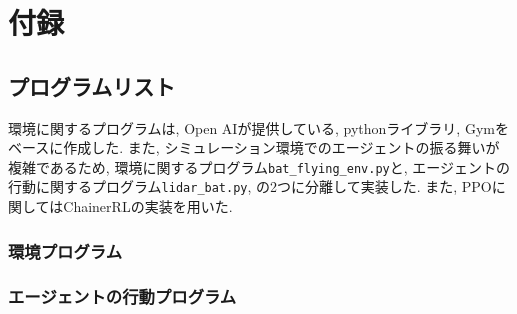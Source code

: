 \documentclass[../main]{subfiles}
\begin{document}
\lstset{language=Python, basicstyle=\ttfamily}

\newpage

\chapter*{付録}


\section{プログラムリスト}
環境に関するプログラムは, Open AIが提供している, 
pythonライブラリ, Gymをベースに作成した.
また, シミュレーション環境でのエージェントの振る舞いが 
複雑であるため, 
環境に関するプログラム\verb|bat_flying_env.py|と, 
エージェントの行動に関するプログラム\verb|lidar_bat.py|, 
の2つに分離して実装した.
また, PPOに関してはChainerRLの実装を用いた.

\subsection{環境プログラム}


\newpage
\subsection{エージェントの行動プログラム}

\end{document}
